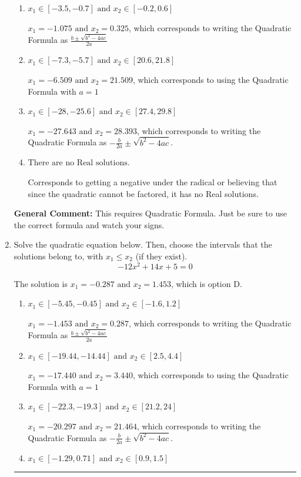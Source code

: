 \documentclass{extbook}[14pt]
\newcommand{\litem}[1]{\item #1

\rule{\textwidth}{0.4pt}}
\begin{document}
\begin{enumerate}
{\begin{enumerate}[label=\Alph*.]
* $x_1 = -0.325 \text{ and } x_2 = 1.075$, which is the correct option.
\item \( x_1 \in [-3.5, -0.7] \text{ and } x_2 \in [-0.2, 0.6] \)

 $x_1 = -1.075 \text{ and } x_2 = 0.325$, which corresponds to writing the Quadratic Formula as $\frac{b \pm \sqrt{b^2 - 4ac}}{2a}$
\item \( x_1 \in [-7.3, -5.7] \text{ and } x_2 \in [20.6, 21.8] \)

 $x_1 = -6.509 \text{ and } x_2 = 21.509$, which corresponds to using the Quadratic Formula with $a=1$
\item \( x_1 \in [-28, -25.6] \text{ and } x_2 \in [27.4, 29.8] \)

 $x_1 = -27.643 \text{ and } x_2 = 28.393$, which corresponds to writing the Quadratic Formula as $-\frac{b}{2a} \pm \sqrt{b^2 - 4ac}$.
\item \( \text{There are no Real solutions.} \)

Corresponds to getting a negative under the radical or believing that since the quadratic cannot be factored, it has no Real solutions.
\end{enumerate}

\textbf{General Comment:} This requires Quadratic Formula. Just be sure to use the correct formula and watch your signs.
}
\litem{
Solve the quadratic equation below. Then, choose the intervals that the solutions belong to, with $x_1 \leq x_2$ (if they exist).
\[ -12x^{2} +14 x + 5 = 0 \]

The solution is \( x_1 = -0.287 \text{ and } x_2 = 1.453 \), which is option D.\begin{enumerate}[label=\Alph*.]
\item \( x_1 \in [-5.45, -0.45] \text{ and } x_2 \in [-1.6, 1.2] \)

 $x_1 = -1.453 \text{ and } x_2 = 0.287$, which corresponds to writing the Quadratic Formula as $\frac{b \pm \sqrt{b^2 - 4ac}}{2a}$
\item \( x_1 \in [-19.44, -14.44] \text{ and } x_2 \in [2.5, 4.4] \)

 $x_1 = -17.440 \text{ and } x_2 = 3.440$, which corresponds to using the Quadratic Formula with $a=1$
\item \( x_1 \in [-22.3, -19.3] \text{ and } x_2 \in [21.2, 24] \)

 $x_1 = -20.297 \text{ and } x_2 = 21.464$, which corresponds to writing the Quadratic Formula as $-\frac{b}{2a} \pm \sqrt{b^2 - 4ac}$.
\item \( x_1 \in [-1.29, 0.71] \text{ and } x_2 \in [0.9, 1.5] \)


\end{enumerate}}
\end{enumerate}
\end{document}
